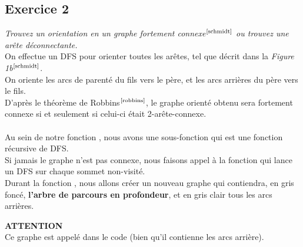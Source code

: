\documentclass{article}      %
\begin{document}
\subsection{Exercice 2}
\textit{\textcolor{exogris}{
Trouvez un orientation en un graphe fortement connexe$^\text{\cite{schmidt}}$ ou trouvez une arête déconnectante.
}}
\\On effectue un DFS pour orienter toutes les arêtes, tel que décrit dans la \textit{Figure 1b}$^\text{\cite{schmidt}}$.
\\On oriente les arcs de parenté du fils vers le père, et les arcs arrières du père vers le fils.
\\D'après le théorème de Robbins$^\text{\cite{robbins}}$, le graphe orienté obtenu sera fortement connexe si et seulement si celui-ci était 2-arête-connexe.
\\\\Au sein de notre fonction , nous avons une sous-fonction  qui est une fonction récursive de DFS.
\\Si jamais le graphe n'est pas connexe, nous faisons appel à la fonction  qui lance un DFS sur chaque sommet non-visité.
\\Durant la fonction , nous allons créer un nouveau graphe qui contiendra, en \textcolor[HTML]{333333}{gris foncé}, \textbf{l'arbre de parcours en profondeur}, et en \textcolor[HTML]{a0a0a0}{gris clair} tous les arcs arrières.
\begin{danger}
{ \scriptsize \textcolor{danger}{ \textbf{ATTENTION}}}
\vspace{3px}
\\ Ce graphe est appelé  dans le code (bien qu'il contienne les arcs arrière).
\end{danger}

\begin{figure}[H]
    \centering
    \\
\end{figure}
\end{document}
